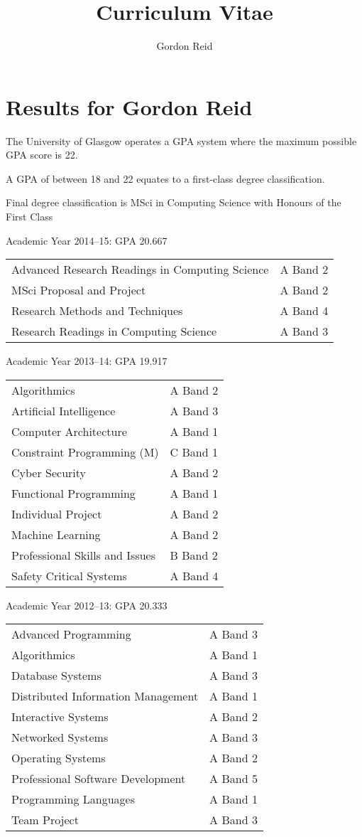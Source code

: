 \documentclass[10pt,a4paper]{article}
\title{Curriculum Vitae}
\author{Gordon Reid}
\begin{document}
\section*{Results for Gordon Reid}
The University of Glasgow operates a GPA system where the maximum possible GPA
score is 22.

A GPA of between 18 and 22 equates to a first-class degree classification.

Final degree classification is MSci in Computing Science with Honours of the
First Class

Academic Year 2014--15: GPA 20.667

\begin{tabular}{p{10cm}l}
    Advanced Research Readings in Computing Science & A Band 2\\
    MSci Proposal and Project & A Band 2\\
    Research Methods and Techniques & A Band 4\\
    Research Readings in Computing Science & A Band 3\\
\end{tabular}

Academic Year 2013--14: GPA 19.917

\begin{tabular}{p{10cm}l}
    Algorithmics & A Band 2\\
    Artificial Intelligence & A Band 3\\
    Computer Architecture & A Band 1\\
    Constraint Programming (M) & C Band 1\\
    Cyber Security & A Band 2\\
    Functional Programming & A Band 1\\
    Individual Project & A Band 2\\
    Machine Learning & A Band 2\\
    Professional Skills and Issues & B Band 2\\
    Safety Critical Systems & A Band 4\\
\end{tabular}

Academic Year 2012--13: GPA 20.333

\begin{tabular}{p{10cm}l}
    Advanced Programming & A Band 3\\
    Algorithmics & A Band 1\\
    Database Systems & A Band 3\\
    Distributed Information Management & A Band 1\\
    Interactive Systems & A Band 2\\
    Networked Systems & A Band 3\\
    Operating Systems & A Band 2\\
    Professional Software Development & A Band 5\\
    Programming Languages & A Band 1\\
    Team Project & A Band 3\\
\end{tabular}
\end{document}

